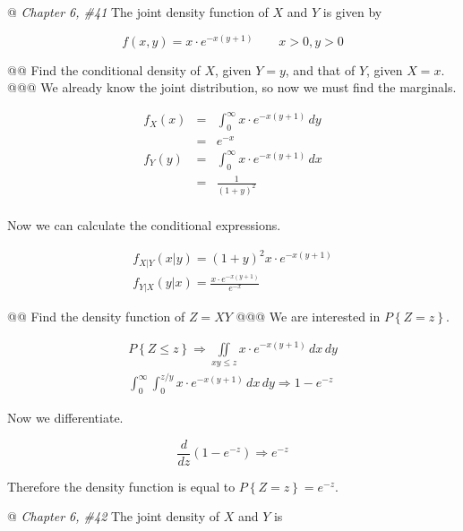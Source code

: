 \documentclass[11pt]{article}\usepackage[]{graphicx}\usepackage[]{xcolor}
\begin{document}
\begin{easylist}[enumerate]
    @ \textit{Chapter 6, \#41} The joint density function of $X$ and $Y$ is given by

    \[
        f(x, y) = x \cdot e^{-x \left( y + 1 \right)} \qquad x > 0, y > 0
    \]

    @@ Find the conditional density of $X$, given $Y = y$, and that of $Y$, given $X =x$.
    @@@ We already know the joint distribution, so now we must find the marginals.

    \[
        \begin{aligned}
            f_X(x) &=& \int_0^\infty x \cdot e^{-x \left( y + 1 \right)} \, dy\\
                    &=& e^{-x}\\
            f_Y(y) &=& \int_0^\infty x \cdot e^{-x \left( y + 1 \right)} \, dx\\
                    &=& \frac{1}{ {\left( 1 + y \right)}^2}\\
        \end{aligned}
    \]

    Now we can calculate the conditional expressions.

    \[
        \begin{aligned}
            f_{X|Y}\left( x|y \right) =
                {\left( 1 + y \right)}^2 x \cdot e^{-x \left( y + 1 \right)}\\
            f_{Y|X}\left( y|x \right) =
                \frac{x \cdot e^{-x \left( y + 1 \right)} }{e^{-x} }
        \end{aligned}
    \]

    @@ Find the density function of $Z = XY$
    @@@ We are interested in $P\left\{ Z = z \right\}$.

    \[
        \begin{aligned}
            P\left\{ Z \le z \right\} \Rightarrow
                \iint\limits_{xy \le z} x \cdot e^{-x \left( y + 1 \right)} \, dx \, dy\\
            \int_0^\infty \int_0^{z/y} x \cdot e^{-x \left( y + 1 \right)} \, dx \, dy \Rightarrow 1 - e^{-z}
        \end{aligned}
    \]

    Now we differentiate.

    \[
        \frac{d}{dz} \left( 1 - e^{-z} \right) \Rightarrow e^{-z}
    \]

    Therefore the density function is equal to $P\left\{ Z = z \right\} = e^{-z}$.

    @ \textit{Chapter 6, \#42} The joint density of $X$ and $Y$ is


\end{easylist}
\end{document}
